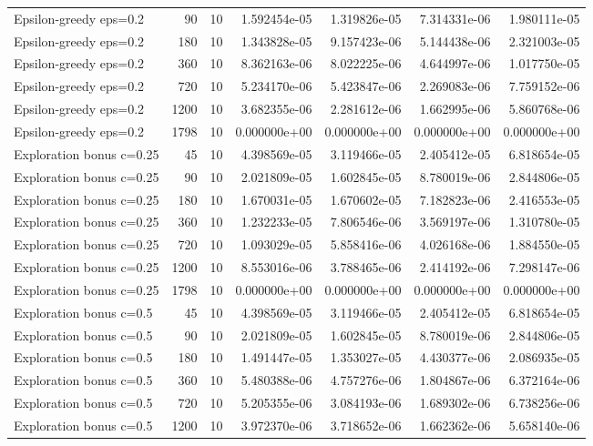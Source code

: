 \begin{scriptsize}
\begin{longtable}{lrrrrrr}
Epsilon-greedy eps=0.2 & 90 & 10 & 1.592454e-05 & 1.319826e-05 & 7.314331e-06 & 1.980111e-05 \\
Epsilon-greedy eps=0.2 & 180 & 10 & 1.343828e-05 & 9.157423e-06 & 5.144438e-06 & 2.321003e-05 \\
Epsilon-greedy eps=0.2 & 360 & 10 & 8.362163e-06 & 8.022225e-06 & 4.644997e-06 & 1.017750e-05 \\
Epsilon-greedy eps=0.2 & 720 & 10 & 5.234170e-06 & 5.423847e-06 & 2.269083e-06 & 7.759152e-06 \\
Epsilon-greedy eps=0.2 & 1200 & 10 & 3.682355e-06 & 2.281612e-06 & 1.662995e-06 & 5.860768e-06 \\
Epsilon-greedy eps=0.2 & 1798 & 10 & 0.000000e+00 & 0.000000e+00 & 0.000000e+00 & 0.000000e+00 \\
Exploration bonus c=0.25 & 45 & 10 & 4.398569e-05 & 3.119466e-05 & 2.405412e-05 & 6.818654e-05 \\
Exploration bonus c=0.25 & 90 & 10 & 2.021809e-05 & 1.602845e-05 & 8.780019e-06 & 2.844806e-05 \\
Exploration bonus c=0.25 & 180 & 10 & 1.670031e-05 & 1.670602e-05 & 7.182823e-06 & 2.416553e-05 \\
Exploration bonus c=0.25 & 360 & 10 & 1.232233e-05 & 7.806546e-06 & 3.569197e-06 & 1.310780e-05 \\
Exploration bonus c=0.25 & 720 & 10 & 1.093029e-05 & 5.858416e-06 & 4.026168e-06 & 1.884550e-05 \\
Exploration bonus c=0.25 & 1200 & 10 & 8.553016e-06 & 3.788465e-06 & 2.414192e-06 & 7.298147e-06 \\
Exploration bonus c=0.25 & 1798 & 10 & 0.000000e+00 & 0.000000e+00 & 0.000000e+00 & 0.000000e+00 \\
Exploration bonus c=0.5 & 45 & 10 & 4.398569e-05 & 3.119466e-05 & 2.405412e-05 & 6.818654e-05 \\
Exploration bonus c=0.5 & 90 & 10 & 2.021809e-05 & 1.602845e-05 & 8.780019e-06 & 2.844806e-05 \\
Exploration bonus c=0.5 & 180 & 10 & 1.491447e-05 & 1.353027e-05 & 4.430377e-06 & 2.086935e-05 \\
Exploration bonus c=0.5 & 360 & 10 & 5.480388e-06 & 4.757276e-06 & 1.804867e-06 & 6.372164e-06 \\
Exploration bonus c=0.5 & 720 & 10 & 5.205355e-06 & 3.084193e-06 & 1.689302e-06 & 6.738256e-06 \\
Exploration bonus c=0.5 & 1200 & 10 & 3.972370e-06 & 3.718652e-06 & 1.662362e-06 & 5.658140e-06 \\

\end{longtable}
\end{scriptsize}
